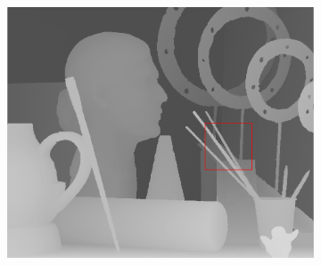 \documentclass[preprint,10pt,5p,times,twocolumn]{elsarticle}
\begin{document}
\begin{figure}[t]
\begin{center}
\begin{subfigure}[b]{0.136\linewidth}
    \includegraphics[width=\linewidth]{cmp_art_8X_MST.png}
    \label{fig:} %
\end{subfigure}


\end{center}
\end{figure}
\end{document}
